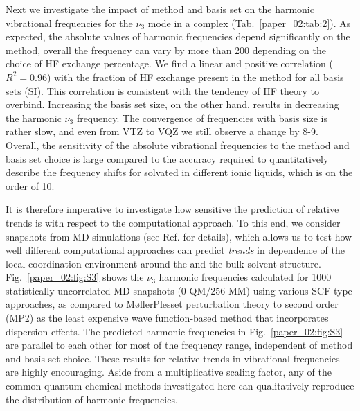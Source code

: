 Next we investigate the impact of method and basis set on the harmonic vibrational frequencies for the \(\nu_{3}\) mode in a \cotil complex (Tab.~\ref{paper_02:tab:2}). As expected, the absolute values of harmonic frequencies depend significantly on the method, overall the frequency can vary by more than \SI{200}{\wavenumber} depending on the choice of HF exchange percentage. We find a linear and positive correlation (\(R^{2} = 0.96\)) with the fraction of HF exchange present in the method for all basis sets (\hyperref[paper_02:sec:SI]{SI}). This correlation is consistent with the tendency of HF theory to overbind. Increasing the basis set size, on the other hand, results in decreasing the harmonic  \(\nu_{3}\) frequency. The convergence of frequencies with basis size is rather slow, and even from VTZ to VQZ we still observe a change by \num{8}-\SI{9}{\wavenumber}. Overall, the sensitivity of the absolute vibrational frequencies to the method and basis set choice is large compared to the accuracy required to quantitatively describe the frequency shifts for  solvated in different ionic liquids, which is on the order of \SI{10}{\wavenumber}.

It is therefore imperative to investigate how sensitive the prediction of relative trends is with respect to the computational approach. To this end, we consider snapshots from MD simulations (see Ref. \citep{Daly2016} for details), which allows us to test how well different computational approaches can predict \emph{trends} in dependence of the local coordination environment around the  and the bulk solvent structure. Fig.~\ref{paper_02:fig:S3} shows the  \(\nu_{3}\) harmonic frequencies calculated for \num{1000} statistically uncorrelated MD snapshots (0 QM/256 MM) using various SCF-type approaches, as compared to M\o{}ller\textendash{}Plesset perturbation theory to second order (MP2) as the least expensive wave function-based method that incorporates dispersion effects.\cite{WCMS:WCMS58} The predicted harmonic frequencies in Fig.~\ref{paper_02:fig:S3} are parallel to each other for most of the frequency range, independent of method and basis set choice. These results for relative trends in vibrational frequencies are highly encouraging. Aside from a multiplicative scaling factor, any of the common quantum chemical methods investigated here can qualitatively reproduce the distribution of harmonic frequencies.

